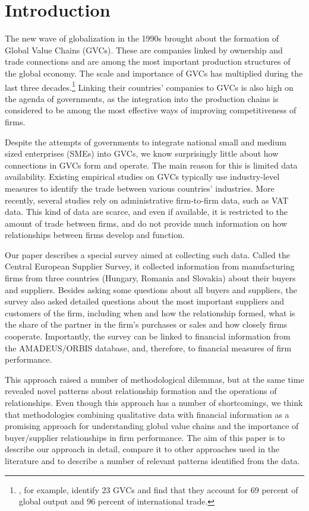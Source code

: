\documentclass[final, dvipsnames, authoryear,12pt]{elsarticle}
\begin{document}
\section{Introduction}

The new wave of globalization in the 1990s brought about the formation of Global Value Chains (GVCs). These are companies linked by ownership and trade connections and are among the most important production structures of the global economy. The scale and importance of GVCs has multiplied during the last three decades.\footnote{\cite{mckinsey2019gvc}, for example, identify 23 GVCs and find that they account for 69 percent of global output and 96 percent of international trade.} Linking their countries' companies to GVCs is also high on the agenda of governments, as the integration into the production chains is considered to be among the most effective ways of improving competitiveness of firms.

Despite the attempts of governments to integrate national small and medium sized enterprises (SMEs) into GVCs, we know surprisingly little about how connections in GVCs form and operate. The main reason for this is limited data availability. Existing empirical studies on GVCs typically use industry-level measures to identify the trade between various countries' industries. More recently, several studies rely on administrative firm-to-firm data, such as VAT data. This kind of data are scarce, and even if available, it is restricted to the amount of trade between firms, and do not provide much information on how relationships between firms develop and function. 

Our paper describes a special survey aimed at collecting such data.  Called the Central European Supplier Survey, it  collected information from manufacturing firms from three countries (Hungary, Romania and Slovakia) about their buyers and suppliers. Besides asking some questions about all buyers and suppliers, the survey also asked detailed questions about the most important suppliers and customers of the firm, including when and how the relationship formed, what is the share of the partner in the firm's purchases or sales and how closely firms cooperate. Importantly, the survey can be linked to financial information from the AMADEUS/ORBIS database, and, therefore, to financial measures of firm performance. 

This approach raised a number of methodological dilemmas, but at the same time revealed novel patterns about relationship formation and the operations of relationships. Even though this approach has a number of shortcomings, we think that methodologies combining qualitative data with financial information as a promising approach for understanding global value chains and the importance of buyer/supplier relationships in firm performance. The aim of this paper is to describe our approach in detail, compare it to other approaches used in the literature and to describe a number of relevant patterns identified from the data. 
\end{document}
